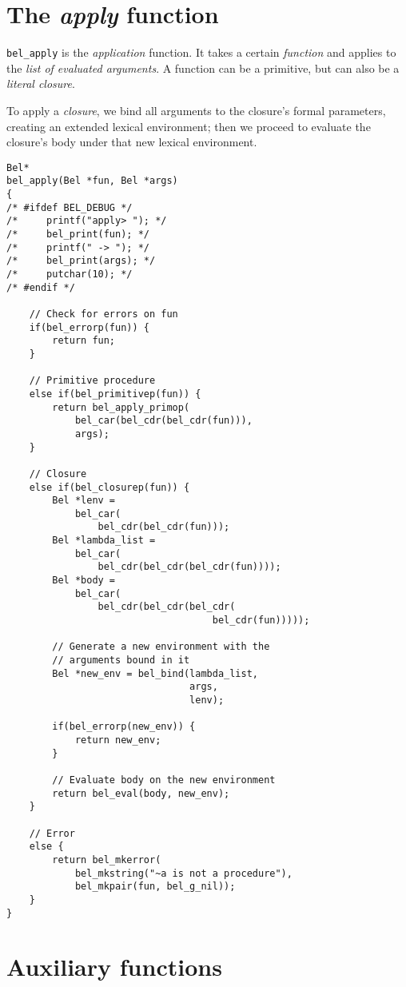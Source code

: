 \documentclass[openright,a4paper,twoside,12pt]{memoir}
\begin{document}
\section{The \emph{apply} function}
\label{sec:orgd846346}

\texttt{bel\_apply} is the \emph{application} function. It takes a certain \emph{function} and
applies to the \emph{list of evaluated arguments}. A function can be a
primitive, but can also be a \emph{literal closure}.

To apply a \emph{closure}, we bind all arguments to the closure's formal
parameters, creating an extended lexical environment; then we proceed
to evaluate the closure's body under that new lexical environment.

\begin{verbatim}
Bel*
bel_apply(Bel *fun, Bel *args)
{
/* #ifdef BEL_DEBUG */
/*     printf("apply> "); */
/*     bel_print(fun); */
/*     printf(" -> "); */
/*     bel_print(args); */
/*     putchar(10); */
/* #endif */
    
    // Check for errors on fun
    if(bel_errorp(fun)) {
        return fun;
    }
    
    // Primitive procedure
    else if(bel_primitivep(fun)) {
        return bel_apply_primop(
            bel_car(bel_cdr(bel_cdr(fun))),
            args);
    }
    
    // Closure
    else if(bel_closurep(fun)) {
        Bel *lenv =
            bel_car(
                bel_cdr(bel_cdr(fun)));
        Bel *lambda_list =
            bel_car(
                bel_cdr(bel_cdr(bel_cdr(fun))));
        Bel *body =
            bel_car(
                bel_cdr(bel_cdr(bel_cdr(
                                    bel_cdr(fun)))));
        
        // Generate a new environment with the
        // arguments bound in it
        Bel *new_env = bel_bind(lambda_list,
                                args,
                                lenv);

        if(bel_errorp(new_env)) {
            return new_env;
        }

        // Evaluate body on the new environment
        return bel_eval(body, new_env);
    }

    // Error
    else {
        return bel_mkerror(
            bel_mkstring("~a is not a procedure"),
            bel_mkpair(fun, bel_g_nil));
    }
}
\end{verbatim}

\section{Auxiliary functions}
\label{sec:org3fa1a92}
\end{document}
